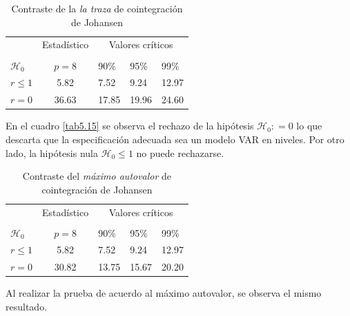 \documentclass[12pt, twoside]{book}\usepackage[]{graphicx}\usepackage[]{color}
\numberwithin{equation}{section}
\numberwithin{theorem}{section}
\numberwithin{teorema}{section}
\numberwithin{defi}{section}
\numberwithin{prop}{section}
\numberwithin{defi}{section}
\theoremstyle{plain}
\begin{document}
\begin{table}[!htpb]
\caption{Contraste de la \textit{la traza} de cointegración de Johansen\label{tab5.15}}
\begin{center}
\begin{tabular}{@{}lrllll@{}}
\toprule
\multicolumn{1}{l}{} & \multicolumn{2}{c}{Estadístico} &
\multicolumn{3}{c}{Valores críticos} \\
\cmidrule(l){2-3} \cmidrule(l){4-6} \\
\multicolumn{1}{l}{$\mathcal{H}_0$} & \multicolumn{2}{c}{$p = 8$} &
\multicolumn{1}{l}{90\%}&
\multicolumn{1}{l}{95\%}&
\multicolumn{1}{l}{99\%}
\\
\midrule
$r \leq 1$  & \multicolumn{2}{c}{5.82}  & 7.52 & 9.24 & 12.97\\
$r = 0$     & \multicolumn{2}{c}{ 36.63}  & 17.85 & 19.96 & 24.60\\
\bottomrule
\end{tabular}
\end{center}
\label{tab-10}
\end{table}

En el cuadro \ref{tab5.15} se observa el rechazo de la hipótesis $\mathcal{H}_{0}: = 0$ lo que descarta que la especificación adecuada sea un modelo VAR en niveles. Por otro lado, la hipótesis nula $\mathcal{H}_{0}\leq 1$ no puede rechazarse. 


\begin{table}[!htpb]
\caption{Contraste del \textit{máximo autovalor} de cointegración de Johansen\label{tab5.16}}
\begin{center}
\begin{tabular}{@{}lrllll@{}}
\toprule
\multicolumn{1}{l}{} & \multicolumn{2}{c}{Estadístico} & \multicolumn{3}{c}{Valores críticos} \\
\cmidrule(l){2-3} \cmidrule(l){4-6} \\
\multicolumn{1}{l}{$\mathcal{H}_0$} & \multicolumn{2}{c}{$p = 8$} &
\multicolumn{1}{l}{90\%}&
\multicolumn{1}{l}{95\%}&
\multicolumn{1}{l}{99\%}
\\
\midrule
$r \leq 1$ & \multicolumn{2}{c}{5.82} & 7.52 & 9.24 & 12.97 \\
$r = 0$ & \multicolumn{2}{c}{30.82} & 13.75 & 15.67 & 20.20 \\
\bottomrule
\end{tabular}
\end{center}
\label{tab-11}
\end{table}

Al realizar la prueba de acuerdo al máximo autovalor, se observa el mismo resultado. 
\end{document}
